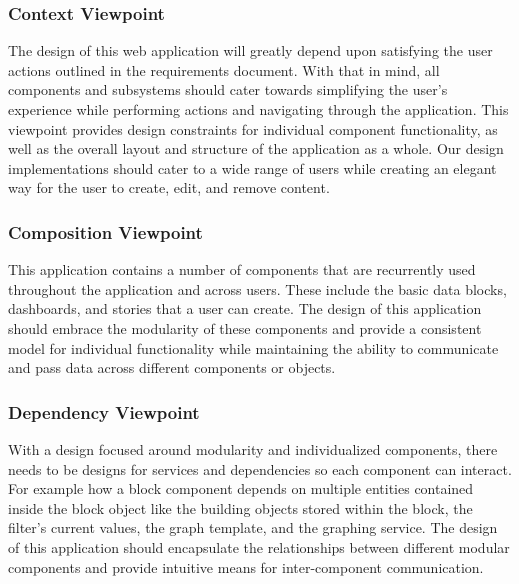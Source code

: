 \documentclass[journal,10pt,onecolumn,compsoc]{IEEEtran}
\begin{document}
    \subsubsection{Context Viewpoint}
    The design of this web application will greatly depend upon satisfying the user actions outlined in the requirements document. With that in mind, all components and subsystems should cater towards simplifying the user's experience while performing actions and navigating through the application. This viewpoint provides design constraints for individual component functionality, as well as the overall layout and structure of the application as a whole. Our design implementations should cater to a wide range of users while creating an elegant way for the user to create, edit, and remove content.
    \subsubsection{Composition Viewpoint}
    This application contains a number of components that are recurrently used throughout the application and across users. These include the basic data blocks, dashboards, and stories that a user can create. The design of this application should embrace the modularity of these components and provide a consistent model for individual functionality while maintaining the ability to communicate and pass data across different components or objects. 
    
    \subsubsection{Dependency Viewpoint}
    With a design focused around modularity and individualized components, there needs to be designs for services and dependencies so each component can interact. For example how a block component depends on multiple entities contained inside the block object like the building objects stored within the block, the filter's current values, the graph template, and the graphing service. The design of this application should encapsulate the relationships between different modular components and provide intuitive means for inter-component communication.

   \iffalse
    The Dependency viewpoint specifies the relationships of interconnection and access among entities. These relationships include shared information, order of execution, or parameterization of interfaces.
        \begin{itemize}
            \item A description of the relationships of this entity with other entities.
            \item Describe the nature of each interaction including such characteristics as timing and conditions for interaction.
            \item Interactions involve the initiation, order of execution, data sharing, creation, duplicating, usage, storage, or destruction of entities.
        \end{itemize}
    This is a viewpoint for modeling the dependencies between our components from the composition viewpoint's constituents.
    \fi 
\end{document}
